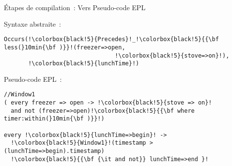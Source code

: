 \begin{frame}[fragile]{Étapes de compilation~: Vers Pseudo-code EPL}
  \begin{minipage}{.45\linewidth}
\vspace*{3.4mm}
      \begin{coloredbox}[black]{\tiny Syntaxe abstraite~:}
      \begin{lstlisting}[language=Maloya,basicstyle=\ttfamily\tiny,escapechar=!]
Occurs(!\colorbox{black!5}{Precedes}!_!\colorbox{black!5}{{\bf less(}10min{\bf )}}!(freezer=>open,
                                !\colorbox{black!5}{stove=>on}!),
       !\colorbox{black!5}{lunchTime}!)
     \end{lstlisting}
\end{coloredbox}
   \vfill
            \begin{coloredbox}[black]{\tiny Pseudo-code EPL~:}
     \begin{lstlisting}[language=EPLPseudoCode,basicstyle=\ttfamily\tiny,escapechar=!]
//Window1
( every freezer => open -> !\colorbox{black!5}{stove => on}! 
  and not (freezer=>open)!\colorbox{black!5}{{\bf where timer:within(}10min{\bf )}}!) 

every !\colorbox{black!5}{lunchTime=>begin}! ->
  !\colorbox{black!5}{Window1}!(timestamp > (lunchTime=>begin).timestamp)
  !\colorbox{black!5}{{\bf {\it and not}} lunchTime=>end }!
     \end{lstlisting}
\end{coloredbox}
 \end{minipage}
 \hfill
 \begin{minipage}{.52\linewidth}
 \end{minipage}
\end{frame}

